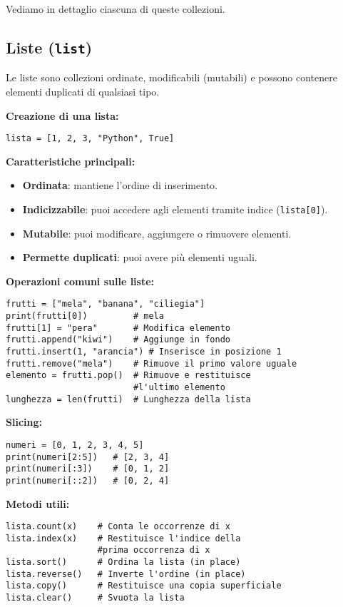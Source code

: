 \documentclass[a4paper,12pt]{article}
\begin{document}
Vediamo in dettaglio ciascuna di queste collezioni.

\subsection*{Liste (\texttt{list})}
Le liste sono collezioni ordinate, modificabili (mutabili) e possono contenere elementi duplicati di qualsiasi tipo.

\textbf{Creazione di una lista:}
\begin{lstlisting}
lista = [1, 2, 3, "Python", True]
\end{lstlisting}

\textbf{Caratteristiche principali:}
\begin{itemize}
    \item \textbf{Ordinata}: mantiene l'ordine di inserimento.
    \item \textbf{Indicizzabile}: puoi accedere agli elementi tramite indice (\texttt{lista[0]}).
    \item \textbf{Mutabile}: puoi modificare, aggiungere o rimuovere elementi.
    \item \textbf{Permette duplicati}: puoi avere più elementi uguali.
\end{itemize}

\textbf{Operazioni comuni sulle liste:}
\begin{lstlisting}
frutti = ["mela", "banana", "ciliegia"]
print(frutti[0])         # mela
frutti[1] = "pera"       # Modifica elemento
frutti.append("kiwi")    # Aggiunge in fondo
frutti.insert(1, "arancia") # Inserisce in posizione 1
frutti.remove("mela")    # Rimuove il primo valore uguale
elemento = frutti.pop()  # Rimuove e restituisce
                         #l'ultimo elemento
lunghezza = len(frutti)  # Lunghezza della lista
\end{lstlisting}

\textbf{Slicing:}
\begin{lstlisting}
numeri = [0, 1, 2, 3, 4, 5]
print(numeri[2:5])   # [2, 3, 4]
print(numeri[:3])    # [0, 1, 2]
print(numeri[::2])   # [0, 2, 4]
\end{lstlisting}

\textbf{Metodi utili:}
\begin{lstlisting}
lista.count(x)    # Conta le occorrenze di x
lista.index(x)    # Restituisce l'indice della
                  #prima occorrenza di x
lista.sort()      # Ordina la lista (in place)
lista.reverse()   # Inverte l'ordine (in place)
lista.copy()      # Restituisce una copia superficiale
lista.clear()     # Svuota la lista
\end{lstlisting}
\end{document}
